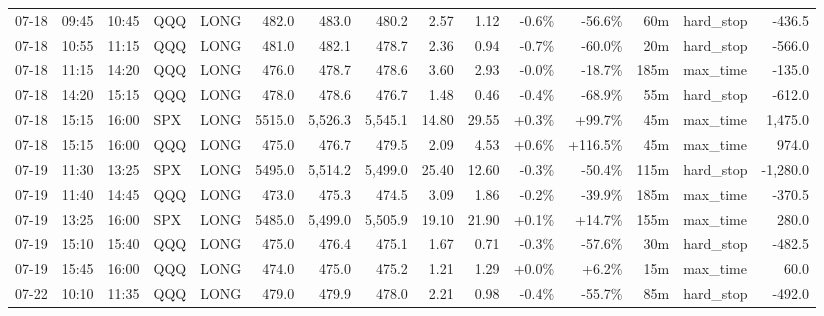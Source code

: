 \documentclass[11pt,a4paper,twoside]{article}
\begin{document}
\begin{landscape}
\begin{center}
\begin{longtable}{>{\color{txtmain}}l l l l l r r r r r r r r >{\color{txtmain}}l r}
07-18 & 09:45 & 10:45 & QQQ & LONG & 482.0 & 483.0 & 480.2 & 2.57 & 1.12 & \textcolor{lossred}{-0.6\%} & \textcolor{lossred}{-56.6\%} & 60m & hard\_stop & \textcolor{lossred}{-436.5} \\
07-18 & 10:55 & 11:15 & QQQ & LONG & 481.0 & 482.1 & 478.7 & 2.36 & 0.94 & \textcolor{lossred}{-0.7\%} & \textcolor{lossred}{-60.0\%} & 20m & hard\_stop & \textcolor{lossred}{-566.0} \\
07-18 & 11:15 & 14:20 & QQQ & LONG & 476.0 & 478.7 & 478.6 & 3.60 & 2.93 & \textcolor{lossred}{-0.0\%} & \textcolor{lossred}{-18.7\%} & 185m & max\_time & \textcolor{lossred}{-135.0} \\
07-18 & 14:20 & 15:15 & QQQ & LONG & 478.0 & 478.6 & 476.7 & 1.48 & 0.46 & \textcolor{lossred}{-0.4\%} & \textcolor{lossred}{-68.9\%} & 55m & hard\_stop & \textcolor{lossred}{-612.0} \\
07-18 & 15:15 & 16:00 & SPX & LONG & 5515.0 & 5,526.3 & 5,545.1 & 14.80 & 29.55 & \textcolor{wingreen}{+0.3\%} & \textcolor{wingreen}{+99.7\%} & 45m & max\_time & \textcolor{wingreen}{1,475.0} \\
07-18 & 15:15 & 16:00 & QQQ & LONG & 475.0 & 476.7 & 479.5 & 2.09 & 4.53 & \textcolor{wingreen}{+0.6\%} & \textcolor{wingreen}{+116.5\%} & 45m & max\_time & \textcolor{wingreen}{974.0} \\
07-19 & 11:30 & 13:25 & SPX & LONG & 5495.0 & 5,514.2 & 5,499.0 & 25.40 & 12.60 & \textcolor{lossred}{-0.3\%} & \textcolor{lossred}{-50.4\%} & 115m & hard\_stop & \textcolor{lossred}{-1,280.0} \\
07-19 & 11:40 & 14:45 & QQQ & LONG & 473.0 & 475.3 & 474.5 & 3.09 & 1.86 & \textcolor{lossred}{-0.2\%} & \textcolor{lossred}{-39.9\%} & 185m & max\_time & \textcolor{lossred}{-370.5} \\
07-19 & 13:25 & 16:00 & SPX & LONG & 5485.0 & 5,499.0 & 5,505.9 & 19.10 & 21.90 & \textcolor{wingreen}{+0.1\%} & \textcolor{wingreen}{+14.7\%} & 155m & max\_time & \textcolor{wingreen}{280.0} \\
07-19 & 15:10 & 15:40 & QQQ & LONG & 475.0 & 476.4 & 475.1 & 1.67 & 0.71 & \textcolor{lossred}{-0.3\%} & \textcolor{lossred}{-57.6\%} & 30m & hard\_stop & \textcolor{lossred}{-482.5} \\
07-19 & 15:45 & 16:00 & QQQ & LONG & 474.0 & 475.0 & 475.2 & 1.21 & 1.29 & \textcolor{wingreen}{+0.0\%} & \textcolor{wingreen}{+6.2\%} & 15m & max\_time & \textcolor{wingreen}{60.0} \\
07-22 & 10:10 & 11:35 & QQQ & LONG & 479.0 & 479.9 & 478.0 & 2.21 & 0.98 & \textcolor{lossred}{-0.4\%} & \textcolor{lossred}{-55.7\%} & 85m & hard\_stop & \textcolor{lossred}{-492.0} \\

\end{longtable}
\end{center}
\end{landscape}
\end{document}
